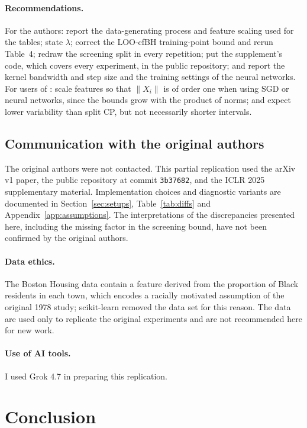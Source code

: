 \paragraph{Recommendations.} For the authors: report the data-generating process and feature scaling used for the
tables; state $\lambda$; correct the LOO-cfBH training-point bound and rerun Table~4; redraw the screening split in
every repetition; put the supplement's code, which covers every experiment, in the public repository; and report
the kernel bandwidth and step size and the training settings of the neural networks. For users of \LOO: scale features so that
$\|X_i\|$ is of order one when using SGD or neural networks, since the bounds grow with the product of norms; and expect
lower variability than split CP, but not necessarily shorter intervals.

\subsection{Communication with the original authors}

The original authors were not contacted. This partial replication used the arXiv v1 paper, the public repository at commit \texttt{3b37682}\supercite{authorscode}, and the ICLR 2025 supplementary material\supercite{leezhang2025supp}. Implementation choices and diagnostic variants are documented in Section~\ref{sec:setups}, Table~\ref{tab:diffs} and Appendix~\ref{app:assumptions}. The interpretations of the discrepancies presented here, including the missing factor in the screening bound, have not been confirmed by the original authors.

\paragraph{Data ethics.} The Boston Housing data contain a feature derived from the proportion of Black residents in
each town, which encodes a racially motivated assumption of the original 1978
study\supercite{carlisle2019racist}; scikit-learn removed the data set for this reason\supercite{sklearn2022boston}.
The data are used only to replicate the original experiments and are not recommended here for new work.

\paragraph{Use of AI tools.} I used Grok 4.7 in preparing this replication.

\section{Conclusion}

